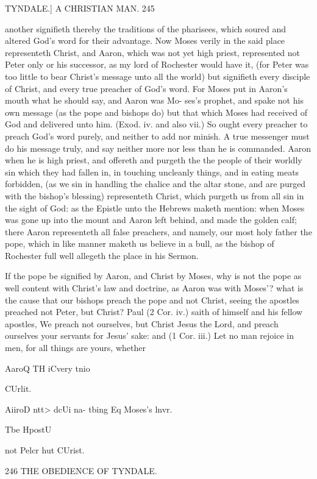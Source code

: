 \documentclass{custom}
\begin{document}
{TYNDALE.]
A CHRISTIAN MAN.
245

another signifieth thereby the traditions of the pharisees, 
which soured and altered God's word for their advantage. 
Now Moses verily in the said place representeth Christ, 
and Aaron, which was not yet high priest, represented not
Peter only or his successor, as my lord of Rochester would 
have it, (for Peter was too little to bear Christ's message 
unto all the world) but signifieth every disciple of Christ, and 
every true preacher of God's word. For Moses put in 
Aaron's mouth what he should say, and Aaron was Mo- 
ses's prophet, and spake not his own message (as the pope 
and bishops do) but that which Moses had received of God 
and delivered unto him. (Exod. iv. and also vii.) So ought 
every preacher to preach God's word purely, and neither 
to add nor minish. A true messenger must do his message 
truly, and say neither more nor less than he is commanded. 
Aaron when he is high priest, and offereth and purgeth the 
the people of their worldly sin which they had fallen in, in 
touching uncleanly things, and in eating meats forbidden, 
(as we sin in handling the chalice and the altar stone, and 
are purged with the bishop's blessing) representeth Christ, 
which purgeth us from all sin in the sight of God: as the 
Epistle unto the Hebrews maketh mention: when Moses 
was gone up into the mount and Aaron left behind, and 
made the golden calf; there Aaron representeth all false 
preachers, and namely, our most holy father the pope, 
which in like manner maketh us believe in a bull, as the 
bishop of Rochester full well allegeth the place in his 
Sermon. 

If the pope be signified by Aaron, and Christ by Moses, 
why is not the pope as well content with Christ's law and 
doctrine, as Aaron was with Moses'? what is the cause 
that our bishops preach the pope and not Christ, seeing 
the apostles preached not Peter, but Christ? Paul (2 
Cor. iv.) saith of himself and his fellow apostles, We 
preach not ourselves, but Christ Jesus the Lord, and preach 
ourselves your servants for Jesus' sake: and (1 Cor. iii.) 
Let no man rejoice in men, for all things are yours, whether 

AaroQ TH 
iCvery tnio 

CUrlit. 

AiiroD ntt> 
dcUi na- 
tbing Eq 
Moses's 
lnvr. 

Tbe HpostU 

not Pelcr 
hut CUrist. 


246 
THE OBEDIENCE OF 
TYNDALE. 

}
\end{document}

